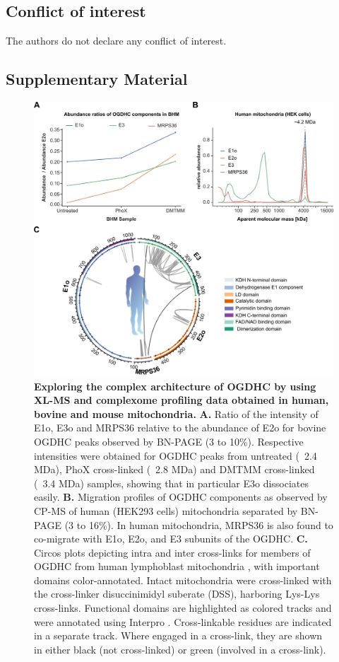 \subsection*{Conflict of interest}
The authors do not declare any conflict of interest.
%
\clearpage
\begin{subappendices}
	\section{Supplementary Material}
	\begin{figure}[hbt!]
		\center
		\includegraphics[]{Chapter.5/Figures/SI_Figure1.png}
		\caption{\textbf{Exploring the complex architecture of OGDHC by using XL-MS and complexome profiling data obtained in human, bovine and mouse mitochondria.} \textbf{A.} Ratio of the intensity of E1o, E3o and MRPS36 relative to the abundance of E2o for bovine OGDHC peaks observed by BN-PAGE (3 to 10\%). Respective intensities were obtained for OGDHC peaks from untreated (~2.4 MDa), PhoX cross-linked (~2.8 MDa) and DMTMM cross-linked (~3.4 MDa) samples, showing that in particular E3o dissociates easily. \textbf{B.} Migration profiles of OGDHC components as observed by CP-MS of human (HEK293 cells) mitochondria separated by BN-PAGE (3 to 16\%). In human mitochondria, MRPS36 is also found to co-migrate with E1o, E2o, and E3 subunits of the OGDHC. \textbf{C.} Circos plots depicting intra and inter cross-links for members of OGDHC from human lymphoblast mitochondria \cite{Ryl_2020}, with important domains color-annotated. Intact mitochondria were cross-linked with the cross-linker disuccinimidyl suberate (DSS), harboring Lys-Lys cross-links. Functional domains are highlighted as colored tracks and were annotated using Interpro \cite{Blum_2021}. Cross-linkable residues are indicated in a separate track. Where engaged in a cross-link, they are shown in either black (not cross-linked) or green (involved in a cross-link).}

\end{figure}
\end{subappendices}
